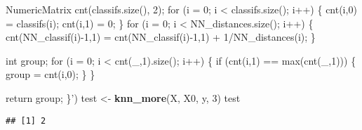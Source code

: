 \documentclass[]{article}
\newenvironment{Shaded}{\begin{snugshade}}{\end{snugshade}}
\newcommand{\DecValTok}[1]{\textcolor[rgb]{0.00,0.00,0.81}{#1}}
\newcommand{\KeywordTok}[1]{\textcolor[rgb]{0.13,0.29,0.53}{\textbf{#1}}}
\newcommand{\NormalTok}[1]{#1}
\newcommand{\StringTok}[1]{\textcolor[rgb]{0.31,0.60,0.02}{#1}}
\begin{document}
\begin{Shaded}
\begin{Highlighting}[]
\StringTok{    NumericMatrix cnt(classifs.size(), 2);}
\StringTok{    for (i = 0; i < classifs.size(); i++) \{}
\StringTok{      cnt(i,0) = classifs(i);}
\StringTok{      cnt(i,1) = 0;}
\StringTok{    \}}
\StringTok{    for (i = 0; i < NN_distances.size(); i++) \{}
\StringTok{      cnt(NN_classif(i)-1,1) = cnt(NN_classif(i)-1,1) + 1/NN_distances(i);}
\StringTok{    \}}

\StringTok{    int group;}
\StringTok{    for (i = 0; i < cnt(_,1).size(); i++) \{}
\StringTok{      if (cnt(i,1) == max(cnt(_,1))) \{}
\StringTok{        group = cnt(i,0);}
\StringTok{      \}}
\StringTok{    \}}

\StringTok{  return group;}
\StringTok{\}'}\NormalTok{)}
\NormalTok{test <-}\StringTok{ }\KeywordTok{knn_more}\NormalTok{(X, X0, y, }\DecValTok{3}\NormalTok{)}
\NormalTok{test}
\end{Highlighting}
\end{Shaded}

\begin{verbatim}
## [1] 2
\end{verbatim}
\end{document}
